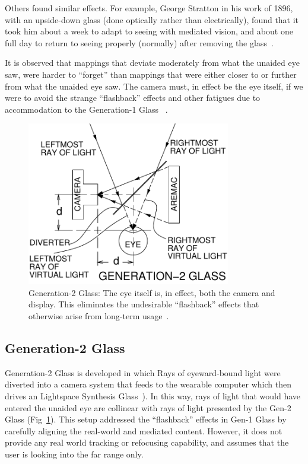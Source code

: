Others found similar effects. For example, George Stratton in his work of 1896, with an upside-down 
glass
(done optically rather than electrically), found that it took him about a week to adapt to seeing with 
mediated vision, and about one full day to return to seeing properly (normally) after removing the 
glass~\cite{stratton1897vision}.

It is observed that mappings that deviate moderately from what the unaided eye saw, were harder to 
``forget'' than mappings that were either closer to or further from what the unaided eye saw.  The 
camera must, in effect be the eye itself, if we were to avoid the strange ``flashback'' effects and other 
fatigues due to accommodation to the Generation-1 Glass ~\cite{schor1987fatigue}.

\begin{figure}
  \center
  \includegraphics[width=3.5in]{ch6/figs/GlassGen2.pdf}
  \caption{Generation-2 Glass: The eye itself is, in effect, both the camera
           and display.  This eliminates the undesirable ``flashback'' effects
           that otherwise arise from long-term usage~\cite{mann2013freeglass}.}
  \label{fig:gentwo}
\end{figure}

\subsection{Generation-2 Glass}
Generation-2 Glass is developed in which Rays of eyeward-bound light were diverted into a camera 
system that feeds to the wearable computer which then drives an Lightspace Synthesis 
Glass~\cite{mann2001aremac}). In this way, rays of light that would have entered the unaided eye are 
collinear with rays of light presented by the Gen-2 Glass (Fig~\ref{fig:gentwo}). This setup addressed 
the ``flashback'' effects in Gen-1 Glass by carefully aligning the real-world and mediated content. 
However, it does not provide any real world tracking or refocusing capability, and assumes that the 
user is looking into the far range only.

